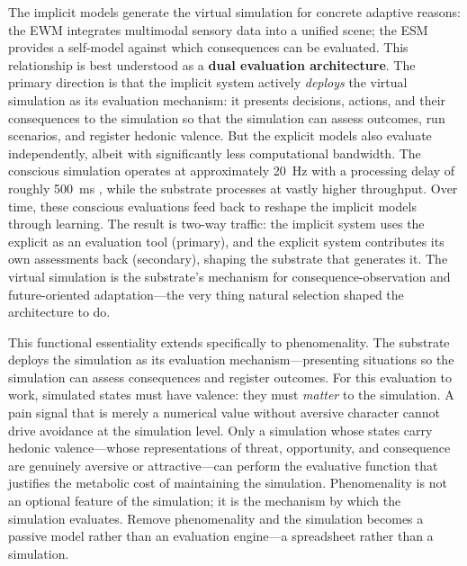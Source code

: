 \documentclass[12pt]{article}
\begin{document}
The implicit models generate the virtual simulation for concrete adaptive reasons: the EWM integrates multimodal sensory data into a unified scene; the ESM provides a self-model against which consequences can be evaluated. This relationship is best understood as a \textbf{dual evaluation architecture}. The primary direction is that the implicit system actively \emph{deploys} the virtual simulation as its evaluation mechanism: it presents decisions, actions, and their consequences to the simulation so that the simulation can assess outcomes, run scenarios, and register hedonic valence. But the explicit models also evaluate independently, albeit with significantly less computational bandwidth. The conscious simulation operates at approximately 20~Hz with a processing delay of roughly 500~ms \citep{VanRullen2003}, while the substrate processes at vastly higher throughput. Over time, these conscious evaluations feed back to reshape the implicit models through learning. The result is two-way traffic: the implicit system uses the explicit as an evaluation tool (primary), and the explicit system contributes its own assessments back (secondary), shaping the substrate that generates it. The virtual simulation is the substrate's mechanism for consequence-observation and future-oriented adaptation---\hspace{0pt}the very thing natural selection shaped the architecture to do.

This functional essentiality extends specifically to phenomenality. The substrate deploys the simulation as its evaluation mechanism---\hspace{0pt}presenting situations so the simulation can assess consequences and register outcomes. For this evaluation to work, simulated states must have valence: they must \emph{matter} to the simulation. A pain signal that is merely a numerical value without aversive character cannot drive avoidance at the simulation level. Only a simulation whose states carry hedonic valence---\hspace{0pt}whose representations of threat, opportunity, and consequence are genuinely aversive or attractive---\hspace{0pt}can perform the evaluative function that justifies the metabolic cost of maintaining the simulation. Phenomenality is not an optional feature of the simulation; it is the mechanism by which the simulation evaluates. Remove phenomenality and the simulation becomes a passive model rather than an evaluation engine---\hspace{0pt}a spreadsheet rather than a simulation.
\end{document}
